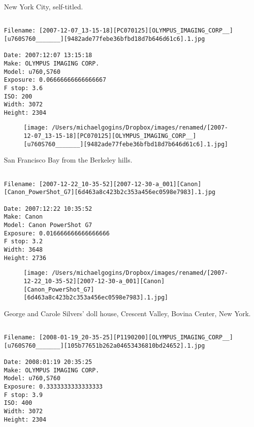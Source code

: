 \clearpage
\onecolumn
\noindent New York City, self-titled.
\noindent
\begin{lstlisting}

Filename: [2007-12-07_13-15-18][PC070125][OLYMPUS_IMAGING_CORP__][u760S760_______][9482ade77febe36bfbd18d7b646d61c6].1.jpg

Date: 2007:12:07 13:15:18
Make: OLYMPUS IMAGING CORP.  
Model: u760,S760       
Exposure: 0.06666666666666667
F stop: 3.6
ISO: 200
Width: 3072
Height: 2304
\end{lstlisting}
\clearpage

\begin{figure}
\texttt{[image: /Users/michaelgogins/Dropbox/images/renamed/[2007-12-07\_13-15-18][PC070125][OLYMPUS\_IMAGING\_CORP\_\_][u760S760\_\_\_\_\_\_\_][9482ade77febe36bfbd18d7b646d61c6].1.jpg]}
\end{figure}
    
\clearpage
\onecolumn
\noindent San Francisco Bay from the Berkeley hills.
\noindent
\begin{lstlisting}

Filename: [2007-12-22_10-35-52][2007-12-30-a_001][Canon][Canon_PowerShot_G7][6d463a8c423b2c353a456ec0598e7983].1.jpg

Date: 2007:12:22 10:35:52
Make: Canon
Model: Canon PowerShot G7
Exposure: 0.016666666666666666
F stop: 3.2
Width: 3648
Height: 2736
\end{lstlisting}
\clearpage

\begin{figure}
\texttt{[image: /Users/michaelgogins/Dropbox/images/renamed/[2007-12-22\_10-35-52][2007-12-30-a\_001][Canon][Canon\_PowerShot\_G7][6d463a8c423b2c353a456ec0598e7983].1.jpg]}
\end{figure}
    
\clearpage
\onecolumn
\noindent George and Carole Silvers' doll house, Crescent Valley, Bovina Center, New York.
\noindent
\begin{lstlisting}

Filename: [2008-01-19_20-35-25][P1190200][OLYMPUS_IMAGING_CORP__][u760S760_______][105b77651b262a04653436810bd24652].1.jpg

Date: 2008:01:19 20:35:25
Make: OLYMPUS IMAGING CORP.  
Model: u760,S760       
Exposure: 0.3333333333333333
F stop: 3.9
ISO: 400
Width: 3072
Height: 2304
\end{lstlisting}
\clearpage

